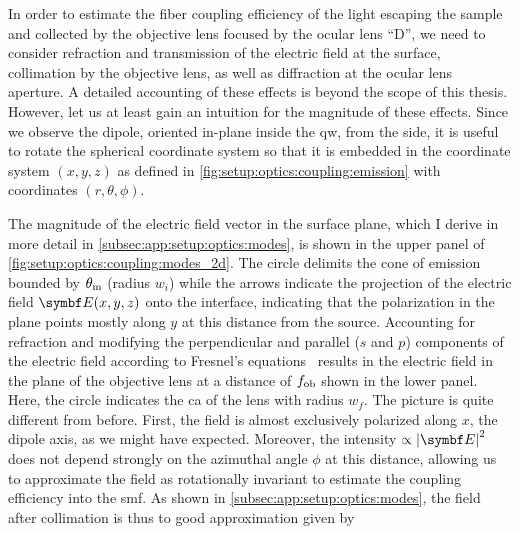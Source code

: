 In order to estimate the fiber coupling efficiency of the light escaping the sample and collected by the objective lens focused by the ocular lens \enquote{D}, we need to consider refraction and transmission of the electric field at the surface, collimation by the objective lens, as well as diffraction at the ocular lens aperture.
A detailed accounting of these effects is beyond the scope of this thesis.
However, let us at least gain an intuition for the magnitude of these effects.
Since we observe the dipole, oriented in-plane inside the \gls{qw}, from the side, it is useful to rotate the spherical coordinate system so that it is embedded in the coordinate system $(x, y, z)$ as defined in \cref{fig:setup:optics:coupling:emission} with coordinates $(r, \theta, \phi)$.

The magnitude of the electric field vector in the surface plane, which I derive in more detail in \cref{subsec:app:setup:optics:modes}, is shown in the upper panel of \cref{fig:setup:optics:coupling:modes_2d}.
The circle delimits the cone of emission bounded by $\theta_{\mathrm{m}}$ (radius $w_i$) while the arrows indicate the projection of the electric field $\bvec{E}(x, y, z)$ onto the interface, indicating that the polarization in the plane points mostly along $y$ at this distance from the source.
Accounting for refraction and modifying the perpendicular and parallel ($s$ and $p$) components of the electric field according to Fresnel's equations~\cite{Hecht2017} results in the electric field in the plane of the objective lens at a distance of $f_{\mathrm{ob}}$ shown in the lower panel.
Here, the circle indicates the \gls{ca} of the lens with radius $w_f$.
The picture is quite different from before.
First, the field is almost exclusively polarized along $x$, the dipole axis, as we might have expected.
Moreover, the intensity $\propto\abs{\bvec{E}}^2$ does not depend strongly on the azimuthal angle $\phi$ at this distance, allowing us to approximate the field as rotationally invariant to estimate the coupling efficiency into the \gls{smf}.
As shown in \cref{subsec:app:setup:optics:modes}, the field after collimation is thus to good approximation given by
